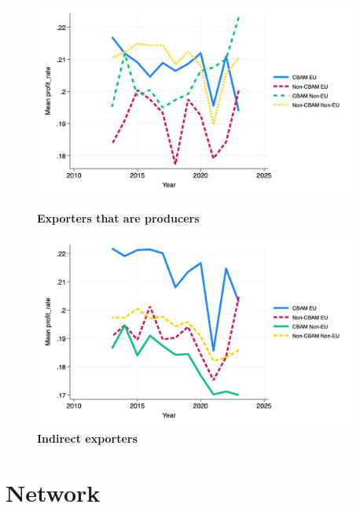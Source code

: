 \documentclass{article}
\begin{document}
\begin{figure}[H]
\centering
\includegraphics[width=0.95\textwidth]{profit_rate_ep.png}
\caption{\textbf{Exporters that are producers}}
\includegraphics[width=0.95\textwidth]{profit_rate_indir.png}
\caption{\textbf{Indirect exporters}}
\end{figure}

\section{Network}
\end{document}
